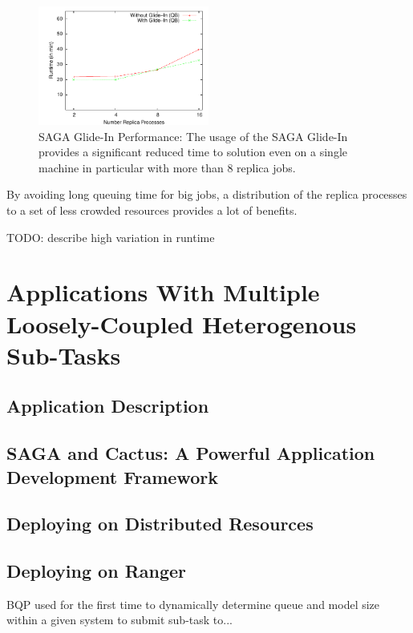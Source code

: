 \documentclass[conference,final]{IEEEtran}
\begin{document}
\begin{figure}[htbp]
    \centering
        \includegraphics[width=0.5\textwidth]{perf_remd_glidin.pdf}
    \caption{SAGA Glide-In Performance: The usage of the SAGA Glide-In provides a significant reduced time to solution even on a single machine in particular with more than 8 replica jobs.}
    \label{fig:perf_remd_glidin}
\end{figure}


By avoiding long queuing time for big jobs, a distribution of the replica processes to a set 
of less crowded resources provides a lot of benefits.

TODO: describe high variation in runtime



\section{Applications With Multiple Loosely-Coupled Heterogenous
Sub-Tasks}

\subsection{Application Description}

\subsection{SAGA and Cactus: A Powerful Application Development
  Framework}

\subsection{Deploying on Distributed Resources}

\subsection{Deploying on Ranger}

BQP used for the first time to dynamically determine queue and model
size within a given system to submit sub-task to...
\end{document}
